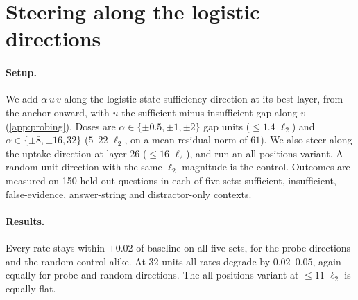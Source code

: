 \section{Steering along the logistic directions}
\label{app:steer-lr}
\paragraph{Setup.} We add $\alpha\,u\,v$ along the logistic state-sufficiency direction at its best layer, from the anchor onward, with $u$ the sufficient-minus-insufficient gap along $v$ (\cref{app:probing}). Doses are $\alpha\in\{\pm0.5,\pm1,\pm2\}$ gap units ($\le1.4$ $\ell_2$) and $\alpha\in\{\pm8,\pm16,32\}$ ($5$--$22$ $\ell_2$, on a mean residual norm of $61$). We also steer along the uptake direction at layer 26 ($\le16$ $\ell_2$), and run an all-positions variant. A random unit direction with the same $\ell_2$ magnitude is the control. Outcomes are measured on 150 held-out questions in each of five sets: sufficient, insufficient, false-evidence, answer-string and distractor-only contexts.

\paragraph{Results.} Every rate stays within $\pm0.02$ of baseline on all five sets, for the probe directions and the random control alike. At $32$ units all rates degrade by $0.02$--$0.05$, again equally for probe and random directions. The all-positions variant at $\le11$ $\ell_2$ is equally flat.
